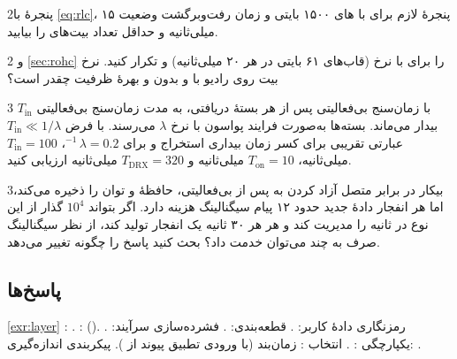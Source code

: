 \documentclass[11pt,a4paper]{article}
\begin{document}
\begin{exercisebox}{2}{پنجرهٔ }\label{exr:rlc}
با \cref{eq:rlc}، پنجرهٔ  لازم برای  با های ۱۵۰۰ بایتی و زمان رفت‌وبرگشت
وضعیت ۱۵ میلی‌ثانیه و حداقل تعداد بیت‌های  را بیابید.
\end{exercisebox}

\begin{exercisebox}{2}{ و }\label{exr:rohc}
\cref{sec:rohc} را برای  با نرخ  (قاب‌های ۶۱ بایتی در هر ۲۰ میلی‌ثانیه) و
 تکرار کنید. نرخ بیت روی رادیو با و بدون  و بهرهٔ ظرفیت چقدر است؟
\end{exercisebox}

\begin{exercisebox}{3}{ با زمان‌سنج بی‌فعالیتی}\label{exr:drxinact}
پس از هر بستهٔ دریافتی،  به مدت زمان‌سنج بی‌فعالیتی $T_{\mathrm{in}}$ بیدار می‌ماند. بسته‌ها به‌صورت
فرایند پواسون با نرخ $\lambda$ می‌رسند. با فرض $T_{\mathrm{in}} \ll 1/\lambda$ عبارتی تقریبی برای کسر زمان
بیداری استخراج و برای $\lambda = 0.2$\,$^{-1}$، $T_{\mathrm{in}} = 100$ میلی‌ثانیه، $T_{\mathrm{on}} = 10$
میلی‌ثانیه و $T_{\mathrm{DRX}} = 320$ میلی‌ثانیه ارزیابی کنید.
\end{exercisebox}

\begin{exercisebox}{3}{بیکار در برابر متصل}\label{exr:idleconn}
آزاد کردن  به  پس از بی‌فعالیتی، حافظهٔ  و توان  را ذخیره می‌کند، اما هر
انفجار دادهٔ جدید حدود ۱۲ پیام سیگنالینگ هزینه دارد. اگر  بتواند $10^4$ گذار از این نوع در ثانیه
را مدیریت کند و هر  هر ۳۰ ثانیه یک انفجار تولید کند، از نظر سیگنالینگ صرف به چند  می‌توان
خدمت داد؟ بحث کنید  پاسخ را چگونه تغییر می‌دهد.
\end{exercisebox}

\subsection*{پاسخ‌ها}

\begin{solutionbox}{\ref{exr:layer}}
: . :  (). رمزنگاری دادهٔ کاربر: . قطعه‌بندی: .
فشرده‌سازی سرآیند: . یکپارچگی : . انتخاب : زمان‌بند  (با ورودی
تطبیق پیوند از ). پیکربندی اندازه‌گیری: .
\end{solutionbox}
\end{document}
